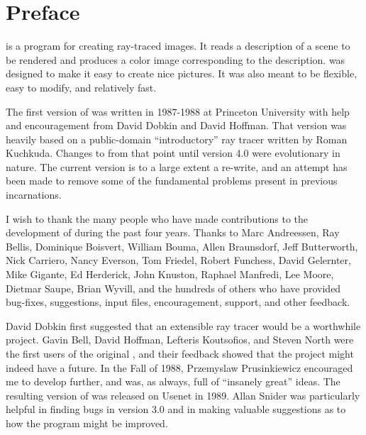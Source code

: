 \chapter*{Preface}

{\Rayshade} is a program for creating ray-traced images.
It reads a description of a scene to be
rendered and produces a color image corresponding to the
description.
{\Rayshade} was designed to make it easy to
create nice pictures.
It was also meant to be flexible, easy to modify,
and relatively fast.

The first version of {\rayshade} was written in 1987-1988 at
Princeton University with help and encouragement from David Dobkin
and David Hoffman.  That version was heavily based on a public-domain
``introductory'' ray tracer written by Roman Kuchkuda.
Changes to {\rayshade} from that point until version 4.0 were
evolutionary in nature.
The current version is to a large extent a re-write,
and an attempt has been made to remove some of the fundamental
problems present in previous incarnations.

I wish to thank the many people who have made
contributions to the development of {\rayshade} during the past four years.
Thanks to Marc Andreessen, Ray Bellis, Dominique Boisvert, William Bouma,
Allen Braunsdorf, Jeff Butterworth, Nick Carriero, Nancy Everson, Tom Friedel,
Robert Funchess, David Gelernter, Mike Gigante, Ed Herderick, John Knuston,
Raphael Manfredi, Lee Moore, Dietmar Saupe, Brian Wyvill,
and the hundreds of others who have provided
bug-fixes, suggestions, input files,
encouragement, support, and other feedback.

David Dobkin first suggested that an extensible
ray tracer would be a worthwhile project.  Gavin Bell, David
Hoffman, Lefteris Koutsofios, and Steven North
were the first users of the original {\rayshade}, and their feedback
showed that the project might indeed have a future.
In the Fall of 1988,
Przemyslaw Prusinkiewicz encouraged me
to develop {\rayshade} further, and was, as always, full of ``insanely
great'' ideas.  The resulting version of {\rayshade} was released
on Usenet in 1989.  Allan Snider was particularly helpful in
finding bugs in version 3.0 and in making valuable suggestions
as to how the program might be improved.

